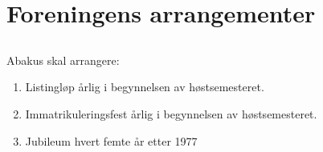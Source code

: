 \section{Foreningens arrangementer}

\subsection{}
Abakus skal arrangere:

\begin{enumerate}[label=\alph*)]
  \item Listingløp årlig i begynnelsen av høstsemesteret.
  \item Immatrikuleringsfest årlig i begynnelsen av høstsemesteret.
  \item Jubileum hvert femte år etter 1977
\end{enumerate}

